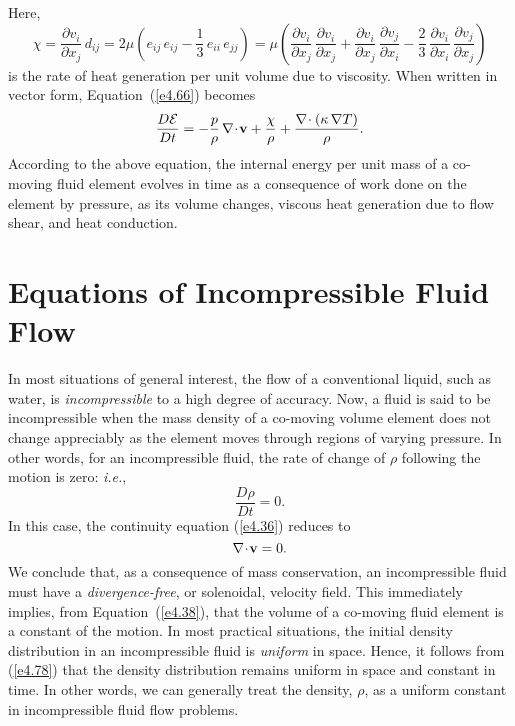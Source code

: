 Here,
\begin{equation}\label{e4.67}
\chi = \frac{\partial v_i}{\partial x_j}\,d_{ij} = 2\mu\left(e_{ij}\,e_{ij} - \frac{1}{3}\,e_{ii}\,e_{jj}\right)
=\mu\left(\frac{\partial v_i}{\partial x_j}\,\frac{\partial v_i}{\partial x_j}+\frac{\partial v_i}{\partial x_j}\,\frac{\partial v_j}{\partial x_i} - \frac{2}{3}\,\frac{\partial v_i}{\partial x_i}\,\frac{\partial v_j}{\partial x_j}\right)
\end{equation}
is the rate of heat generation per unit volume due to viscosity.
When written in vector form, Equation~(\ref{e4.66}) becomes
\begin{equation}\label{e4.68}
\frac{D{\cal E}}{Dt} = - \frac{p}{\rho}\,\nabla\!\cdot\!{\bf v} + \frac{\chi}{\rho} +\frac{\nabla\!\cdot(
\kappa\,\nabla T)}{\rho}.
\end{equation}
According to the above equation, the internal energy per unit mass of a co-moving fluid element
evolves in time as a consequence of work done on the element by pressure, as 
its volume changes, viscous heat generation due to flow shear, and heat conduction.

\section{Equations of Incompressible Fluid Flow}\label{siff}
In most situations of general interest, the flow of a conventional liquid, such as water, is {\em incompressible}\/ to
a high degree of accuracy. Now, a fluid is said to be incompressible  when the mass density of a co-moving volume element 
does not change appreciably as the element moves through regions of varying pressure. In other words,  for an incompressible fluid, the rate of change of $\rho$
following the motion is zero: {\em i.e.},
\begin{equation}\label{e4.78}
\frac{D\rho}{Dt} = 0.
\end{equation}
In this case, the continuity equation (\ref{e4.36}) reduces to
\begin{equation}
\nabla\!\cdot\!{\bf v} = 0.
\end{equation}
We conclude that,  as a consequence of mass conservation, an incompressible fluid must have a {\em divergence-free}, or solenoidal,  velocity field. This immediately implies, from Equation~(\ref{e4.38}), that  the volume of a co-moving fluid element is a constant of the motion. In most practical situations, the initial density distribution in an incompressible fluid is {\em uniform}\/ in space. 
Hence, it follows from (\ref{e4.78}) that the density distribution remains uniform in space and constant in time.
In other words, we can generally treat the density, $\rho$, as a  uniform constant  in incompressible fluid flow problems. 

